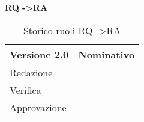 \textbf{RQ -\textgreater RA}

\begin{table}[h]
\begin{center}

\begin{tabular}{p{} p{}}
\toprule
\textbf{Versione 2.0}	&	\textbf{Nominativo}\\
\midrule
\midrule
Redazione	&	\EZ \\
\midrule
Verifica &	\AB	\\
\midrule
Approvazione	&	\DC	\\
\bottomrule
\end{tabular}
\caption{Storico ruoli RQ -\textgreater RA}
\label{tabVers2}
\end{center}
\end{table}